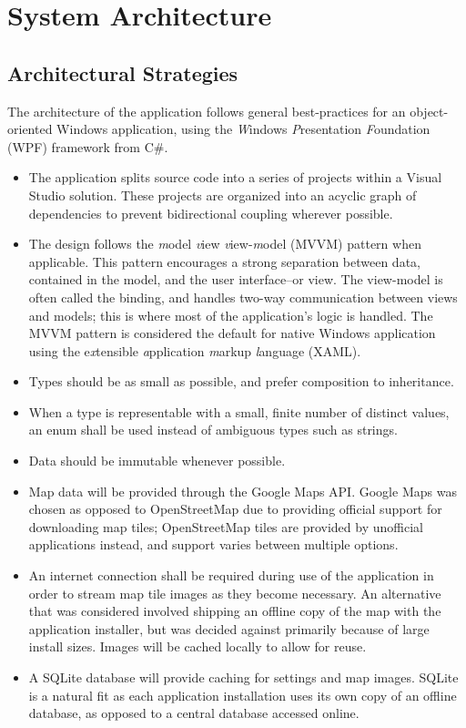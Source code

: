 \documentclass[12pt, letterpaper]{article}
\begin{document}
\newpage
\section{System Architecture}\label{arch}
\subsection{Architectural Strategies}
The architecture of the application follows general best-practices for an object-oriented Windows application,
  using the \emph{W}indows \emph{P}resentation \emph{F}oundation (WPF) framework from C\#.
\begin{itemize}
  \item The application splits source code into a series of projects within a Visual Studio solution.
    These projects are organized into an acyclic graph of dependencies to prevent bidirectional coupling wherever possible.
  \item The design follows the \emph{m}odel \emph{v}iew \emph{v}iew-\emph{m}odel (MVVM) pattern when applicable.
    This pattern encourages a strong separation between data, contained in the model, and the user interface--or view.
    The view-model is often called the binding, and handles two-way communication between views and models;
    this is where most of the application's logic is handled.
    The MVVM pattern is considered the default for native Windows application using the e\emph{x}tensible \emph{a}pplication \emph{m}arkup \emph{l}anguage (XAML)\cite{msdn_mvvm}.
  \item Types should be as small as possible, and prefer composition to inheritance.
  \item When a type is representable with a small, finite number of distinct values, an enum shall be used instead of ambiguous types such as strings.
  \item Data should be immutable whenever possible.
  \item Map data will be provided through the Google Maps API.
    Google Maps was chosen as opposed to OpenStreetMap due to providing official support for downloading map tiles\cite{gmaps_tiles};
    OpenStreetMap tiles are provided by unofficial applications instead, and support varies between multiple options\cite{osm_tiles}.
  \item An internet connection shall be required during use of the application in order to stream map tile images as they become necessary.
    An alternative that was considered involved shipping an offline copy of the map with the application installer,
    but was decided against primarily because of large install sizes.
    Images will be cached locally to allow for reuse.
  \item A SQLite database will provide caching for settings and map images.
    SQLite is a natural fit as each application installation uses its own copy of an offline database, as opposed to a central database accessed online.
\end{itemize}
\end{document}
